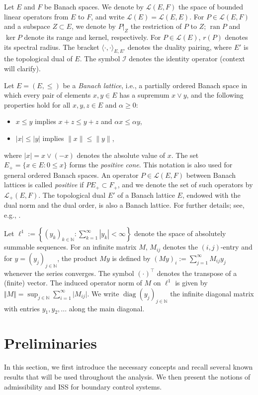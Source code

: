 \documentclass[onecolumn]{autart}
\def\N{\mathbb N}
\numberwithin{equation}{section}
\begin{document}
	Let $E$ and $F$ be Banach spaces. {We} denote by $\mathcal{L}(E,F)$ the space of bounded linear operators from $E$ to $F$, and write $\mathcal{L}(E) = \mathcal{L}(E,E)$. For $P \in \mathcal{L}(E,F)$ and a subspace $Z \subset E$, {we denote by} $P\vert_{Z}$ the restriction of $P$ to $Z$; $\operatorname{ran} P$ and $\ker P$ denote its range and kernel, respectively. For $P \in \mathcal{L}(E)$, $r(P)$ denotes its spectral radius. The bracket $\langle \cdot,\cdot\rangle_{E,E'}$ denotes the duality pairing, where $E'$ is the topological dual of $E$. The symbol $\mathcal{I}$ denotes the identity operator (context will clarify).
	
	Let $E = (E, \le)$ be a \emph{Banach lattice}, i.e., a partially ordered Banach space in which every pair of elements $x, y \in E$ has a supremum $x \vee y$, and the following properties hold for all $x, y, z \in E$ and $\alpha \ge 0$:
	\begin{itemize}
		\item $x \le y$ implies $x + z \le y + z$ and $\alpha x \le \alpha y$,
		\item $|x| \le |y|$ implies $\|x\| \le \|y\|$,
	\end{itemize}
	where $|x| = x \vee (-x)$ denotes the absolute value of $x$. The set $E_+ = \{x \in E : 0\le x\}$ forms the \emph{positive cone}. This notation is also used for general ordered Banach spaces. An operator $P \in \mathcal{L}(E,F)$ between Banach lattices is called \emph{positive} if $P E_+ \subset F_+$, and we denote the set of such operators by $\mathcal{L}_+(E,F)$. The topological dual $E'$ of a Banach lattice $E$, endowed with the dual norm and the dual order, is also a Banach lattice. For further details; see, e.g., \cite{CHARALAMBOS,Schaf}.
	
	Let $\ell^1 := \left\{ (y_k)_{k \in \mathbb{N}}: \sum_{k=1}^{\infty} |y_k| < \infty \right\}$ denote the space of absolutely summable sequences. For an infinite matrix $M$, $M_{ij}$ denotes the $(i,j)$-entry and for $y = (y_j)_{j\in \N}$, the product $M y$ is defined by  $(M y)_i:=\sum_{j=1}^{\infty}M_{ij}y_j$ whenever the series converges. The symbol $(\cdot)^\top$ denotes the transpose of a (finite) vector. The induced operator norm of ${M}$ on $\ell^1$ is given by $\Vert M \Vert=\sup_{j\in \N}\sum_{i=1}^{\infty}\vert M_{ij}\vert$. We write $\operatorname{diag}(y_j)_{j \in \N}$ the infinite diagonal matrix with entries $y_1, y_2, ...$ along the main diagonal.

    \section{Preliminaries}\label{Sec:2}
    In this section, we first introduce the necessary concepts and recall several known results that will be used throughout the analysis. We then present the notions of admissibility and ISS for boundary control systems.
\end{document}

